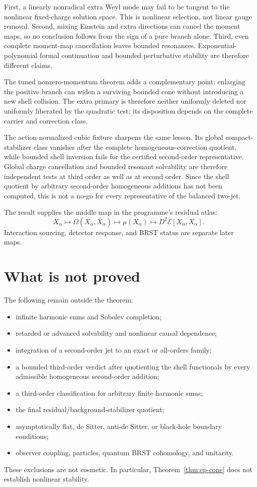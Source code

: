 \documentclass[11pt]{article}
\theoremstyle{definition}
\theoremstyle{remark}
\newcommand{\cE}{\mathcal E}
\begin{document}
First, a linearly nonradical extra Weyl mode may fail to be tangent to the
nonlinear fixed-charge solution space.  This is nonlinear selection, not
linear gauge removal.  Second, mixing Einstein and extra directions can
cancel the moment maps, so no conclusion follows from the sign of a pure
branch alone.  Third, even complete moment-map cancellation leaves bounded
resonances.  Exponential-polynomial formal continuation and bounded
perturbative stability are therefore different claims.

The tuned nonzero-momentum theorem adds a complementary point: enlarging the
positive branch can widen a surviving bounded cone without introducing a new
shell collision.  The extra primary is therefore neither uniformly deleted
nor uniformly liberated by the quadratic test; its disposition depends on
the complete carrier and correction class.

The action-normalized cubic fixture sharpens the same lesson.  Its global
compact-stabilizer class vanishes after the complete homogeneous-correction
quotient, while bounded shell inversion fails for the certified
second-order representative.  Global charge cancellation and bounded
resonant solvability are therefore independent tests at third order as well
as at second order.  Since the shell quotient by arbitrary second-order
homogeneous additions has not been computed, this is not a no-go for every
representative of the balanced two-jet.

The result supplies the middle map in the programme's residual atlas:
\[
 X_\alpha
 \longmapsto \Omega(X_\alpha,\overline X_\alpha)
 \longmapsto \mu(X_\alpha)
 \longmapsto D^2\cE[X_\alpha,X_\alpha].
\]
Interaction sourcing, detector response, and BRST status are separate later
maps.

\section{What is not proved}

The following remain outside the theorem:
\begin{itemize}
\item infinite harmonic sums and Sobolev completion;
\item retarded or advanced solvability and nonlinear causal dependence;
\item integration of a second-order jet to an exact or all-orders family;
\item a bounded third-order verdict after quotienting the shell functionals
      by every admissible homogeneous second-order addition;
\item a third-order classification for arbitrary finite harmonic sums;
\item the final residual/background-stabilizer quotient;
\item asymptotically flat, de Sitter, anti-de Sitter, or black-hole boundary
      conditions;
\item observer coupling, particles, quantum BRST cohomology, and unitarity.
\end{itemize}
These exclusions are not cosmetic.  In particular, Theorem~\ref{thm:ep-cone}
does not establish nonlinear stability.
\end{document}
